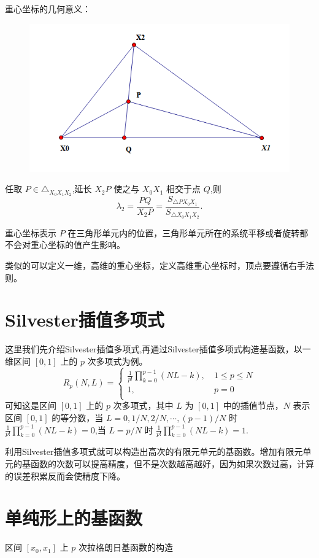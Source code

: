 \documentclass[12pt,a4paper]{article}
\begin{document}
重心坐标的几何意义：

\begin{figure}[H]
\centering
\includegraphics[scale=0.7]{./figures/2.png}
\caption{}
\end{figure}

任取 $P\in \triangle_{X_0 X_1 X_2}$,延长 $X_2 P$ 使之与 $X_0 X_1$ 相交于点 $Q$,则
$$
\lambda _2=\frac {PQ}{X_2 P}=\frac{S_{\triangle PX_0 X_1}}{S_{\triangle X_0 X_1 X_2}}.
$$

重心坐标表示 $P$ 在三角形单元内的位置，三角形单元所在的系统平移或者旋转都不会对重心坐标的值产生影响。

类似的可以定义一维，高维的重心坐标，定义高维重心坐标时，顶点要遵循右手法则。

\section{Silvester插值多项式}
这里我们先介绍Silvester插值多项式,再通过Silvester插值多项式构造基函数，以一维区间 $[0,1]$ 上的 $p$ 次多项式为例。
$$
R_p (N,L)=\begin{cases}
\frac{1}{p!}\prod_{k=0}^{p-1} (NL-k),~& 1\leqslant p\leqslant N\\
1,& p=0\\
\end{cases}
$$
可知这是区间 $[0,1]$ 上的 $p$ 次多项式，其中 $L$ 为 $[0,1]$ 中的插值节点，$N$ 表示区间 $[0,1]$ 的等分数，当 $L=0,1/N,2/N,\cdots ,(p-1)/N$ 时 $\frac{1}{p!}\prod_{k=0}^{p-1} (NL-k) =0$,当 $L=p/N$ 时 $\frac{1}{p!}\prod_{k=0}^{p-1} (NL-k) =1.$

利用Silvester插值多项式就可以构造出高次的有限元单元的基函数。增加有限元单元的基函数的次数可以提高精度，但不是次数越高越好，因为如果次数过高，计算的误差积累反而会使精度下降。

\section{单纯形上的基函数}
区间 $[x_0,x_1]$ 上 $p$ 次拉格朗日基函数的构造
\end{document}
